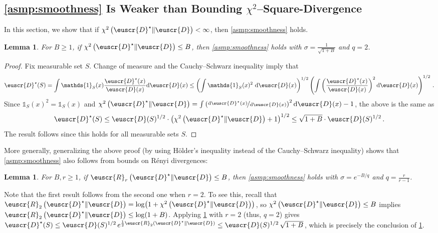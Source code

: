 \documentclass[11pt]{article}
\theoremstyle{plain}
\newtheorem{lemma}[theorem]{Lemma}
\theoremstyle{definition}
\theoremstyle{remark}
\newcommand{\sinparen}[1]{(#1)}
\newcommand{\inparen}[1]{\left(#1\right)}
\newcommand{\chidiv}[2]{\chi^2\inparen{#1\|#2}}
\newcommand{\renyi}[3]{\cR_{#1}\inparen{#2\|#3}}
\newcommand{\nfrac}[2]{\nicefrac{#1}{#2}}
\newcommand{\customcal}[1]{\euscr{#1}}
\newcommand{\cD}{\customcal{D}}
\newcommand{\cR}{\customcal{R}}
\renewcommand{\d}{{\rm d}}
\newcommand{\cDtrue}{\cD^\star}
\newcommand{\cDgiven}{\cD}
\begin{document}
    \subsection{\cref{asmp:smoothness} Is Weaker than Bounding $\chi^2$--Square-Divergence}\label{sec:distCloseness}
        In this section, we show that if $\chidiv{\cDtrue}{\cD}<\infty$, then \cref{asmp:smoothness} holds. %
        \begin{lemma}
            \label{lem:closenessFromChiSquare}
            For $B\geq 1$, if $\chidiv{\cDtrue}{\cDgiven}\leq B$, then \cref{asmp:smoothness} holds with $\sigma=\frac{1}{\sqrt{1+B}}$ and $q=2$.
        \end{lemma}
        \begin{proof}
            Fix measurable set $S$.
            Change of measure and the Cauchy--Schwarz inequality imply that
            \[
                \cDtrue(S) 
                = \int \mathds{1}_S(x) \frac{\cDtrue(x)}{\cD(x)}\d\cD(x)
                \leq 
                    \inparen{
                        \int \mathds{1}_S(x)^{2}~ \d\cD(x)
                    }^{1/2}
                    \inparen{
                        \int \inparen{\frac{\cDtrue(x)}{\cD(x)}}^2 \d \cD(x)
                    }^{1/2}\,.
            \]
        Since $\mathds{1}_S(x)^{2}=\mathds{1}_S(x)$ and $
                \chidiv{\cDtrue}{\cD}= 
            {\int \inparen{\nfrac{\d \cDtrue(x)}{\d \cD(x)}}^2 \d \cD(x)} - 1$,
        the above is the same as 
        \[
            \cDtrue(S) \leq \cD(S)^{1/2}\cdot 
                \inparen{\chidiv{\cDtrue}{\cD}+1}^{1/2}
                \leq 
                    \sqrt{1+B}\cdot 
                    \cD(S)^{1/2}
                \,.
        \]
        The result follows since this holds for all measurable sets $S$.
        \end{proof}
        More generally, generalizing the above proof (by using Hölder's inequality instead of the Cauchy--Schwarz inequality) shows that \cref{asmp:smoothness} also follows from bounds on Rényi divergences:
        \begin{lemma}
            \label{lem:closenessFromRenyi}
            For $B,r\geq 1$, if $\renyi{r}{\cDtrue}{\cDgiven}\leq B$, then \cref{asmp:smoothness} holds with $\sigma=e^{-B/q}$ and $q=\frac{r}{r-1}$.
        \end{lemma}
        Note that the first result follows from the second one when $r=2$.
        To see this, recall that $\renyi{2}{\cDtrue}{\cD} = \log\sinparen{1+\chidiv{\cDtrue}{\cD}}$, so $\chidiv{\cDtrue}{\cD}\le B$ implies $\renyi{2}{\cDtrue}{\cD}\le\log(1+B)$. 
        Applying \cref{lem:closenessFromRenyi} with $r=2$ (thus, $q=2$) gives $\cDtrue(S) \le \cD(S)^{1/2}\,e^{\frac{1}{2}\renyi{2}{\cDtrue}{\cD}} \le \cD(S)^{1/2}\,\sqrt{1+B}$, which is precisely the conclusion of \cref{lem:closenessFromChiSquare}.
        
\end{document}
